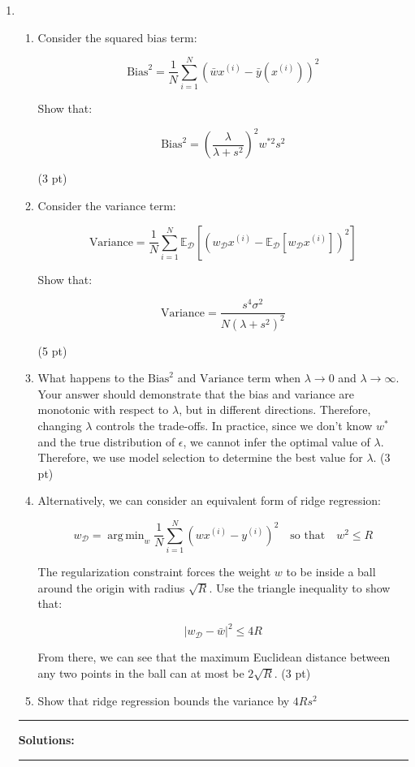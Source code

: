 \documentclass{article}
\DeclareMathOperator*{\argmin}{arg\,min}
\theoremstyle{definition}
\theoremstyle{remark}
\newenvironment{Q}
    {%
      \clearpage
      \item
    }
    {%
      \phantom{s}
      \bigskip
    \hrule
    \vspace{1em}
      \textbf{Solutions: } \\
    \hrule
    }
\begin{document}
\begin{enumerate}[font={\Large\bfseries},left=0pt]
\begin{Q}
\begin{enumerate}
			\item Consider the squared bias term:

			      $$
				      \text{Bias}^2 = \frac{1}{N} \sum_{i=1}^N (\bar{w}x^{(i)} - \bar{y}(x^{(i)}))^2
			      $$

			      Show that:

			      $$
				      \text{Bias}^2 = \left( \frac{\lambda}{\lambda + s^2}\right)^2 w^{*2} s^2
			      $$

			      (3 pt)

			\item Consider the variance term:

			      $$
				      \text{Variance} = \frac{1}{N} \sum_{i=1}^N \mathbb{E}_{\mathcal{D}} \left[(w_{\mathcal{D}}x^{(i)} - \mathbb{E}_{\mathcal{D}}[w_{\mathcal{D}} x^{(i)}])^2\right]
			      $$

			      Show that:

			      $$
				      \text{Variance} = \frac{s^4 \sigma^2}{N(\lambda + s^2)^2}
			      $$

			      (5 pt)

			\item What happens to the $\text{Bias}^2$ and $\text{Variance}$ term when $\lambda \to 0$ and $\lambda \to \infty$. Your answer should demonstrate that the bias and variance are monotonic with respect to $\lambda$, but in different directions. Therefore, changing $\lambda$ controls the trade-offs. In practice, since we don't know $w^*$ and the true distribution of $\epsilon$, we cannot infer the optimal value of $\lambda$. Therefore, we use model selection to determine the best value for $\lambda$. (3 pt)

			\item Alternatively, we can consider an equivalent form of ridge regression:

			      $$
				      w_{\mathcal{D}} =\argmin_w \frac{1}{N} \sum_{i=1}^N (wx^{(i)}-y^{(i)})^2 \quad \text{so that} \quad w^2 \leq R
			      $$

			      The regularization constraint forces the weight $w$ to be inside a ball around the origin with radius $\sqrt{R}$. Use the triangle inequality to show that:

			      $$|w_{\mathcal{D}} - \bar{w}|^2 \leq 4R$$

			      From there, we can see that the maximum Euclidean distance between any two points in the ball can at most be $2\sqrt{R}$. (3 pt)

			\item Show that ridge regression bounds the variance by $4Rs^2$


\end{enumerate}
\end{Q}
\end{enumerate}
\end{document}

